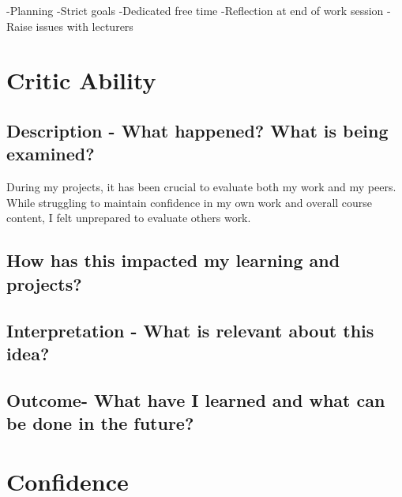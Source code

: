 \documentclass{scrartcl}
\begin{document}
-Planning  
-Strict goals  
-Dedicated free time  
-Reflection at end of work session  
-Raise issues with lecturers


\section{Critic Ability}

\subsection{Description - What happened? What is being examined?}

During my projects, it has been crucial to evaluate both my work and my peers. While struggling to maintain confidence in my own work and overall course content, I felt unprepared to evaluate others work.

\subsection{How has this impacted my learning and projects?}

\subsection{Interpretation - What is relevant about this idea?}

\subsection{Outcome- What have I learned and what can be done in the future?}


\section{Confidence}



%
%
\end{document}
